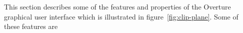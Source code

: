 %
%
% 

This section describes some of the features and properties of the Overture graphical user interface
which is illustrated in figure~\ref{fig:clip-plane}.
Some of these features are

